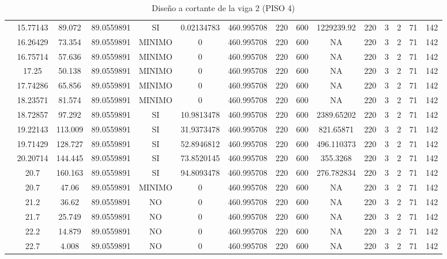 \begin{table}[H]
{\begin{tabular}{|c|c|c|c|c|c|c|c|c|c|c|c|c|c|c|}
\cline{2-15}    & 15.77143 & 89.072 & 89.0559891 & SI  & 0.02134783 & 460.995708 & 220 & 600 & 1229239.92 & 220 & 3   & 2   & 71  & 142 \bigstrut\\
\cline{2-15}    & 16.26429 & 73.354 & 89.0559891 & MINIMO & 0   & 460.995708 & 220 & 600 & NA  & 220 & 3   & 2   & 71  & 142 \bigstrut\\
\cline{2-15}    & 16.75714 & 57.636 & 89.0559891 & MINIMO & 0   & 460.995708 & 220 & 600 & NA  & 220 & 3   & 2   & 71  & 142 \bigstrut\\
\cline{2-15}    & 17.25 & 50.138 & 89.0559891 & MINIMO & 0   & 460.995708 & 220 & 600 & NA  & 220 & 3   & 2   & 71  & 142 \bigstrut\\
\cline{2-15}    & 17.74286 & 65.856 & 89.0559891 & MINIMO & 0   & 460.995708 & 220 & 600 & NA  & 220 & 3   & 2   & 71  & 142 \bigstrut\\
\cline{2-15}    & 18.23571 & 81.574 & 89.0559891 & MINIMO & 0   & 460.995708 & 220 & 600 & NA  & 220 & 3   & 2   & 71  & 142 \bigstrut\\
\cline{2-15}    & 18.72857 & 97.292 & 89.0559891 & SI  & 10.9813478 & 460.995708 & 220 & 600 & 2389.65202 & 220 & 3   & 2   & 71  & 142 \bigstrut\\
\cline{2-15}    & 19.22143 & 113.009 & 89.0559891 & SI  & 31.9373478 & 460.995708 & 220 & 600 & 821.65871 & 220 & 3   & 2   & 71  & 142 \bigstrut\\
\cline{2-15}    & 19.71429 & 128.727 & 89.0559891 & SI  & 52.8946812 & 460.995708 & 220 & 600 & 496.110373 & 220 & 3   & 2   & 71  & 142 \bigstrut\\
\cline{2-15}    & 20.20714 & 144.445 & 89.0559891 & SI  & 73.8520145 & 460.995708 & 220 & 600 & 355.3268 & 220 & 3   & 2   & 71  & 142 \bigstrut\\
\cline{2-15}    & 20.7 & 160.163 & 89.0559891 & SI  & 94.8093478 & 460.995708 & 220 & 600 & 276.782834 & 220 & 3   & 2   & 71  & 142 \bigstrut\\
\cline{2-15}    & 20.7 & 47.06 & 89.0559891 & MINIMO & 0   & 460.995708 & 220 & 600 & NA  & 220 & 3   & 2   & 71  & 142 \bigstrut\\
\cline{2-15}    & 21.2 & 36.62 & 89.0559891 & NO  & 0   & 460.995708 & 220 & 600 & NA  & 220 & 3   & 2   & 71  & 142 \bigstrut\\
\cline{2-15}    & 21.7 & 25.749 & 89.0559891 & NO  & 0   & 460.995708 & 220 & 600 & NA  & 220 & 3   & 2   & 71  & 142 \bigstrut\\
\cline{2-15}    & 22.2 & 14.879 & 89.0559891 & NO  & 0   & 460.995708 & 220 & 600 & NA  & 220 & 3   & 2   & 71  & 142 \bigstrut\\
\cline{2-15}    & 22.7 & 4.008 & 89.0559891 & NO  & 0   & 460.995708 & 220 & 600 & NA  & 220 & 3   & 2   & 71  & 142 \bigstrut\\
\hline
\end{tabular}%

  
 
  }%
    \caption{Diseño a cortante de la viga 2 (PISO 4) }
  \label{tab:C VG2 P4 }%
\end{table}%
